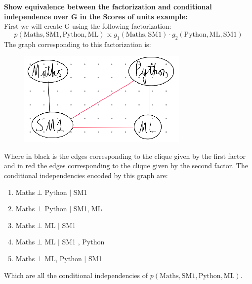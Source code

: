\begin{appendices}
\begin{question}\label{question:graph-equivelance}
    \textbf{Show equivalence between the factorization and conditional independence over G in the Scores of units example:} \\
    First we will create G using the following factorization:
    \begin{equation}
        p(\text{Maths}, \text{SM}1, \text{Python}, \text{ML}) \propto g_{1}(\text{Maths}, \text{SM}1) \cdot g_{2}(\text{Python}, \text{ML}, \text{SM}1)
    \end{equation}
    The graph corresponding to this factorization is:
    \begin{figure}[h]
    \includegraphics[width=\textwidth/2]{images/factor_graph.png}
    \centering
    \end{figure}
    Where in black is the edges corresponding to the clique given by the first factor and in red the edges corresponding to the clique given by the second factor. The conditional independencies encoded by this graph are:
    \begin{enumerate}
        \item Maths $\bot$ Python $|$ SM1
        \item Maths $\bot$ Python $|$ SM1, ML 
        \item Maths $\bot$ ML $|$ SM1
        \item Maths $\bot$ ML $|$ SM1 , Python
        \item Maths $\bot$ ML, Python $|$ SM1
    \end{enumerate}
    Which are all the conditional independencies of $p(\text{Maths}, \text{SM}1, \text{Python}, \text{ML})$. 


\end{question}
\end{appendices}
